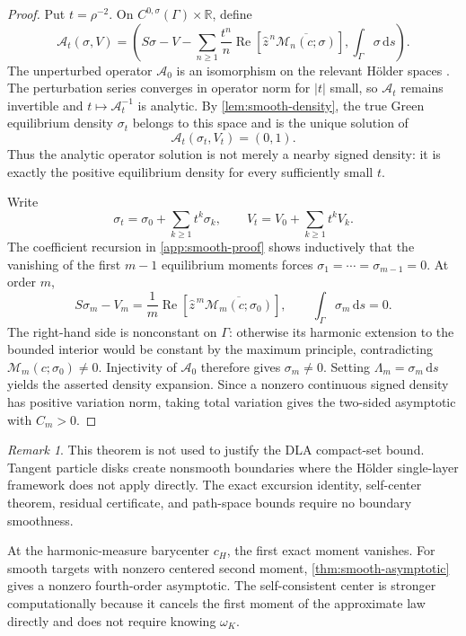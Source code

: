\documentclass[11pt]{article}
\theoremstyle{mainthm}
\theoremstyle{definition}
\theoremstyle{remark}
\newtheorem{remark}[remark]{Remark}
\newcommand{\dd}{\,\mathrm d}
\newcommand{\Real}{\operatorname{Re}}
\begin{document}
\begin{proof}
Put $t=\rho^{-2}$. On $C^{0,\sigma}(\Gamma)\times\mathbb R$, define
\[
  \mathcal A_t(\sigma,V)
  =\left(
  S\sigma-V
  -\sum_{n\ge1}\frac{t^n}{n}
  \Real\left[\widehat z^{\,n}
  \overline{\mathcal M_n(c;\sigma)}\right],
  \int_\Gamma\sigma\dd s
  \right).
\]
The unperturbed operator $\mathcal A_0$ is an isomorphism on the relevant H\"older spaces \cite{Kress2014}. The perturbation series converges in operator norm for $|t|$ small, so $\mathcal A_t$ remains invertible and $t\mapsto\mathcal A_t^{-1}$ is analytic. By \cref{lem:smooth-density}, the true Green equilibrium density $\sigma_t$ belongs to this space and is the unique solution of
\[
  \mathcal A_t(\sigma_t,V_t)=(0,1).
\]
Thus the analytic operator solution is not merely a nearby signed density: it is exactly the positive equilibrium density for every sufficiently small $t$.

Write
\[
  \sigma_t=\sigma_0+\sum_{k\ge1}t^k\sigma_k,
  \qquad
  V_t=V_0+\sum_{k\ge1}t^kV_k.
\]
The coefficient recursion in \cref{app:smooth-proof} shows inductively that the vanishing of the first $m-1$ equilibrium moments forces
$\sigma_1=\cdots=\sigma_{m-1}=0$. At order $m$,
\[
  S\sigma_m-V_m
  =\frac1m\Real\left[
   \widehat z^{\,m}
   \overline{\mathcal M_m(c;\sigma_0)}
  \right],
  \qquad
  \int_\Gamma\sigma_m\dd s=0.
\]
The right-hand side is nonconstant on $\Gamma$: otherwise its harmonic extension to the bounded interior would be constant by the maximum principle, contradicting
$\mathcal M_m(c;\sigma_0)\ne0$. Injectivity of $\mathcal A_0$ therefore gives $\sigma_m\ne0$. Setting $\Lambda_m=\sigma_m\dd s$ yields the asserted density expansion. Since a nonzero continuous signed density has positive variation norm, taking total variation gives the two-sided asymptotic with $C_m>0$.
\end{proof}

\begin{remark}
This theorem is not used to justify the DLA compact-set bound. Tangent particle disks create nonsmooth boundaries where the H\"older single-layer framework does not apply directly. The exact excursion identity, self-center theorem, residual certificate, and path-space bounds require no boundary smoothness.
\end{remark}

At the harmonic-measure barycenter $c_H$, the first exact moment vanishes. For smooth targets with nonzero centered second moment, \cref{thm:smooth-asymptotic} gives a nonzero fourth-order asymptotic. The self-consistent center is stronger computationally because it cancels the first moment of the approximate law directly and does not require knowing $\omega_K$.
\end{document}
